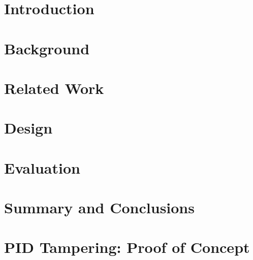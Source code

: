 \documentclass[a4paper,12pt,twoside,openright]{report}
\begin{document}
\pagestyle{empty}
\singlespacing
{}

\restoregeometry
\onehalfspacing

\singlespacing


\setcounter{page}{0}
\pagestyle{plain}
\tableofcontents
{}
\listoffigures
{}
\listoftables

\onehalfspacing

\raggedbottom

\chapter{Introduction}
\setcounter{page}{1} 


\chapter{Background} 
\label{sec:background}


\chapter{Related Work} 
\label{sec:related}


\chapter{Design}
\label{sec:design}


\chapter{Evaluation} 
\label{sec:eval}


\chapter{Summary and Conclusions}
\label{sec:conclusion}



\appendix
\singlespacing

\chapter{PID Tampering: Proof of Concept}
\end{document}
